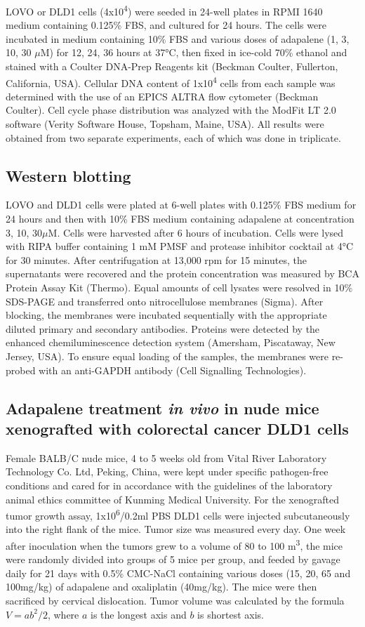 LOVO or DLD1 cells (4x10\textsuperscript{4}) were seeded in 24-well plates in RPMI 1640 medium containing 0.125\% FBS, and cultured for 24 hours. The cells were incubated in medium containing 10\% FBS and various doses of adapalene (1, 3, 10, 30 $\mu$M) for 12, 24, 36 hours at 37°C, then fixed in ice-cold 70\% ethanol and stained with a Coulter DNA-Prep Reagents kit (Beckman Coulter, Fullerton, California, USA). Cellular DNA content of 1x10\textsuperscript{4} cells from each sample was determined with the use of an EPICS ALTRA flow cytometer (Beckman Coulter). Cell cycle phase distribution was analyzed with the ModFit LT 2.0 software (Verity Software House, Topsham, Maine, USA). All results were obtained from two separate experiments, each of which was done in triplicate.

\subsection{Western blotting}

LOVO and DLD1 cells were plated at 6-well plates with 0.125\% FBS medium for 24 hours and then with 10\% FBS medium containing adapalene at concentration 3, 10, 30$\mu$M. Cells were harvested after 6 hours of incubation. Cells were lysed with RIPA buffer containing 1 mM PMSF and protease inhibitor cocktail at 4°C for 30 minutes. After centrifugation at 13,000 rpm for 15 minutes, the supernatants were recovered and the protein concentration was measured by BCA Protein Assay Kit (Thermo). Equal amounts of cell lysates were resolved in 10\% SDS-PAGE and transferred onto nitrocellulose membranes (Sigma). After blocking, the membranes were incubated sequentially with the appropriate diluted primary and secondary antibodies. Proteins were detected by the enhanced chemiluminescence detection system (Amersham, Piscataway, New Jersey, USA). To ensure equal loading of the samples, the membranes were re-probed with an anti-GAPDH antibody (Cell Signalling Technologies).

\subsection{Adapalene treatment \textit{in vivo} in nude mice xenografted with colorectal cancer DLD1 cells}

Female BALB/C nude mice, 4 to 5 weeks old from Vital River Laboratory Technology Co. Ltd, Peking, China, were kept under specific pathogen-free conditions and cared for in accordance with the guidelines of the laboratory animal ethics committee of Kunming Medical University. For the xenografted tumor growth assay, 1x10\textsuperscript{6}/0.2ml PBS DLD1 cells were injected subcutaneously into the right flank of the mice. Tumor size was measured every day. One week after inoculation when the tumors grew to a volume of 80 to 100 m\textsuperscript{3}, the mice were randomly divided into groups of 5 mice per group, and feeded by gavage daily for 21 days with 0.5\% CMC-NaCl containing various doses (15, 20, 65 and 100mg/kg) of adapalene and oxaliplatin (40mg/kg). The mice were then sacrificed by cervical dislocation. Tumor volume was calculated by the formula $V=ab^2/2$, where $a$ is the longest axis and $b$ is shortest axis.

